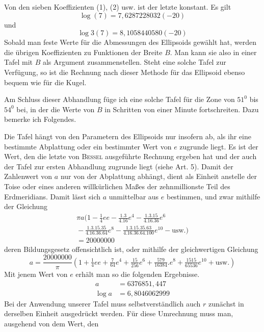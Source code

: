 %
Von den sieben Koeffizienten (1), (2) usw. ist der letzte konstant. Es gilt
\[
\log(7)=7{,}6287228032(-20)
\]
und
\[
\log3(7)=8{,}1058440580(-20)
\]
Sobald man feste Werte für die Abmessungen des Ellipsoids gewählt hat, werden die übrigen Koeffizienten zu Funktionen der Breite \(B\). Man kann sie also in einer Tafel mit \(B\) als Argument zusammenstellen. Steht eine solche Tafel zur Verfügung, so ist die Rechnung nach dieser Methode für das Ellipsoid ebenso bequem wie für die Kugel.

Am Schluss dieser Abhandlung füge ich eine solche Tafel für die Zone von \(51^0\) bis \(54^0\) bei, in der die Werte von \(B\) in Schritten von einer Minute fortschreiten. Dazu bemerke ich Folgendes.

Die Tafel hängt von den Parametern des Ellipsoids nur insofern ab, als ihr eine bestimmte Abplattung oder ein bestimmter Wert von \(e\) zugrunde liegt. Es ist der Wert, den die letzte von \textsc{Bessel} ausgeführte Rechnung ergeben hat und der auch der Tafel zur ersten Abhandlung zugrunde liegt (siehe Art. 5). Damit der Zahlenwert von \(a\) nur von der Abplattung abhängt, dient als Einheit anstelle der Toise oder eines anderen willkürlichen Maßes der zehnmillionste Teil des Erdmeridians. Damit lässt sich \(a\) unmittelbar aus \(e\) bestimmen, und zwar mithilfe der Gleichung
\[
\begin{aligned}
\pi a(1-\tfrac14ee-\frac{1\mathord{.}3}{4\mathord{.}16}e^4-\frac{1\mathord{.}3\mathord{.}15}{4\mathord{.}16\mathord{.}36}e^6\\
{}-\frac{1\mathord{.}3\mathord{.}15\mathord{.}35}{4\mathord{.}16\mathord{.}36\mathord{.}64}e^8
-\frac{1\mathord{.}3\mathord{.}15\mathord{.}35\mathord{.}63}{4\mathord{.}16\mathord{.}36\mathord{.}64\mathord{.}100}e^{10}-\text{usw.})\\
=20000000
\end{aligned}
\]
deren Bildungsgesetz offensichtlich ist, oder mithilfe der gleichwertigen Gleichung
\[
a=\frac{20000000}{\pi}(1+\tfrac14ee+\tfrac7{64}e^4+\tfrac{15}{256}e^6+\tfrac{579}{16384}\mathord{.}e^8+\tfrac{1515}{65536}e^{10}+\text{usw.})
\]
Mit jenem Wert von \(e\) erhält man so die folgenden Ergebnisse.
\[
\begin{aligned}
a&=6376851{,}447\\
\log a&=6{,}8046062999
\end{aligned}
\]
Bei der Anwendung unserer Tafel muss selbstverständlich auch \(r\) zunächst in derselben Einheit ausgedrückt werden. Für diese Umrechnung muss man, ausgehend von dem Wert, den
